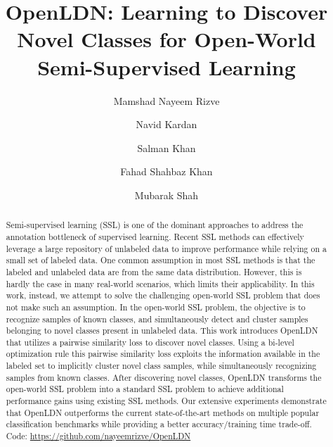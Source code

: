 \documentclass[runningheads]{eccv2022submission}
\begin{document}
\pagestyle{headings}
\mainmatter
\def\ECCVSubNumber{6665}  

\title{OpenLDN: Learning to Discover Novel Classes for Open-World Semi-Supervised Learning} 

\begin{comment}
\titlerunning{ECCV-22 submission ID \ECCVSubNumber} 
\authorrunning{ECCV-22 submission ID \ECCVSubNumber} 
\author{Anonymous ECCV submission}
\institute{Paper ID \ECCVSubNumber}
\end{comment}


\author{Mamshad Nayeem Rizve \and
Navid Kardan \and
Salman Khan \and
Fahad Shahbaz Khan \and
Mubarak Shah}
\maketitle

\begin{abstract}
Semi-supervised learning (SSL) is one of the dominant approaches to address the annotation bottleneck of supervised learning. Recent SSL methods can effectively leverage a large repository of unlabeled data to improve performance while relying on a small set of labeled data. One common assumption in most SSL methods is that the labeled and unlabeled data are from the same data distribution. However, this is hardly the case in many real-world scenarios, which limits their applicability. In this work, instead, we attempt to solve the challenging open-world SSL problem that does not make such an assumption. In the open-world SSL problem, the objective is to recognize samples of known classes, and simultaneously detect and cluster samples belonging to novel classes present in unlabeled data. This work introduces OpenLDN that utilizes a pairwise similarity loss to discover novel classes. Using a bi-level optimization rule this pairwise similarity loss exploits the information available in the labeled set to implicitly cluster novel class samples, while simultaneously recognizing samples from known classes. After discovering novel classes, OpenLDN transforms the open-world SSL problem into a standard SSL problem to achieve additional performance gains using existing SSL methods. Our extensive experiments demonstrate that OpenLDN outperforms the current state-of-the-art methods on multiple popular classification benchmarks while providing a better accuracy/training time trade-off. Code: \url{https://github.com/nayeemrizve/OpenLDN}
\end{abstract}
\end{document}
